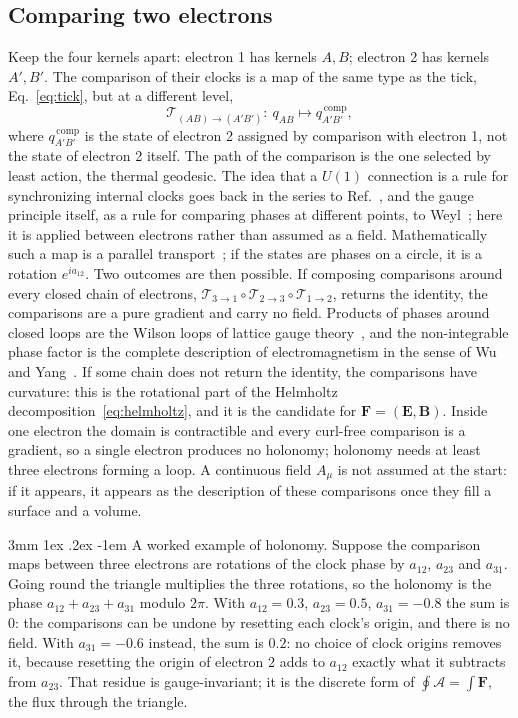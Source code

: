 \documentclass[%
 reprint, amsmath,amssymb, aps, prb, ]{revtex4-2}
\makeatletter
\numberwithin{equation}{section}
\renewcommand\paragraph{%
  \@startsection{paragraph}{4}{\z@}%
    {3mm \@plus 1ex \@minus .2ex}%
    {-1em}%
    {\normalfont\normalsize\itshape}}
\newcommand{\FF}{\mathbf{F}}
\newcommand{\Tmap}{\mathcal{T}}
\makeatother
\begin{document}
\subsection{Comparing two electrons}

Keep the four kernels apart: electron 1 has kernels $A,B$; electron 2 has kernels $A',B'$. The comparison of their clocks is a map of the same type as the tick, Eq.~\eqref{eq:tick}, but at a different level,
\begin{equation}
\Tmap_{(AB)\to(A'B')}:\ q_{AB}\longmapsto q_{A'B'}^{\,\mathrm{comp}},
\label{eq:compare}
\end{equation}
where $q_{A'B'}^{\,\mathrm{comp}}$ is the state of electron 2 assigned by comparison with electron 1, not the state of electron 2 itself. The path of the comparison is the one selected by least action, the thermal geodesic. The idea that a $U(1)$ connection is a rule for synchronizing internal clocks goes back in the series to Ref.~\cite{ref:p17}, and the gauge principle itself, as a rule for comparing phases at different points, to Weyl~\cite{ref:weyl29}; here it is applied between electrons rather than assumed as a field. Mathematically such a map is a parallel transport~\cite{ref:nakahara}; if the states are phases on a circle, it is a rotation $e^{ia_{12}}$. Two outcomes are then possible. If composing comparisons around every closed chain of electrons, $\Tmap_{3\to1}\circ\Tmap_{2\to3}\circ\Tmap_{1\to2}$, returns the identity, the comparisons are a pure gradient and carry no field. Products of phases around closed loops are the Wilson loops of lattice gauge theory~\cite{ref:wilson74}, and the non-integrable phase factor is the complete description of electromagnetism in the sense of Wu and Yang~\cite{ref:wuyang}. If some chain does not return the identity, the comparisons have curvature: this is the rotational part of the Helmholtz decomposition~\eqref{eq:helmholtz}, and it is the candidate for $\FF=(\mathbf{E},\mathbf{B})$. Inside one electron the domain is contractible and every curl-free comparison is a gradient, so a single electron produces no holonomy; holonomy needs at least three electrons forming a loop. A continuous field $A_\mu$ is not assumed at the start: if it appears, it appears as the description of these comparisons once they fill a surface and a volume.

\paragraph{A worked example of holonomy.} Suppose the comparison maps between three electrons are rotations of the clock phase by $a_{12}$, $a_{23}$ and $a_{31}$. Going round the triangle multiplies the three rotations, so the holonomy is the phase $a_{12}+a_{23}+a_{31}$ modulo $2\pi$. With $a_{12}=0.3$, $a_{23}=0.5$, $a_{31}=-0.8$ the sum is $0$: the comparisons can be undone by resetting each clock's origin, and there is no field. With $a_{31}=-0.6$ instead, the sum is $0.2$: no choice of clock origins removes it, because resetting the origin of electron $2$ adds to $a_{12}$ exactly what it subtracts from $a_{23}$. That residue is gauge-invariant; it is the discrete form of $\oint\mathcal{A}=\int\FF$, the flux through the triangle.
\end{document}

